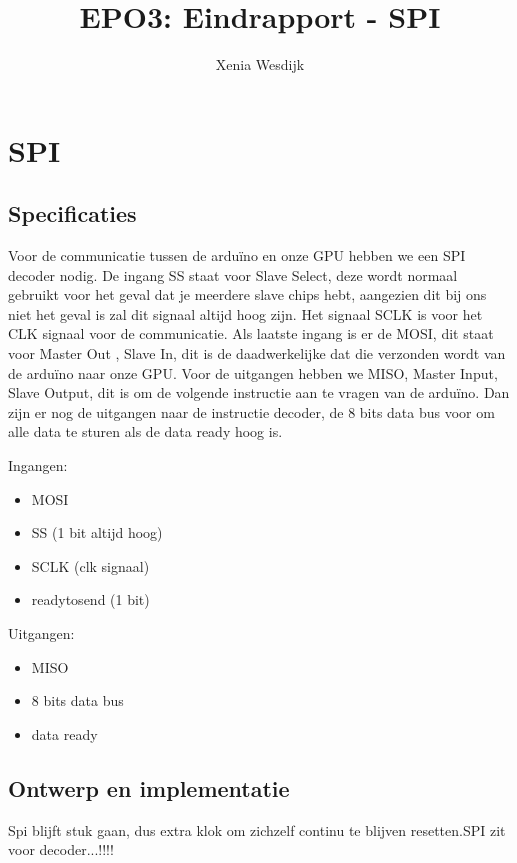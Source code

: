 \documentclass{scrartcl} %
\author{Xenia Wesdijk}
\title{EPO3: Eindrapport - SPI}
\begin{document}
\section{SPI}
\label{sec:spi}

\subsection{Specificaties}
Voor de communicatie tussen de arduïno en onze GPU hebben we een SPI decoder nodig. De ingang SS staat voor Slave Select, deze wordt normaal gebruikt voor het geval dat je meerdere slave chips hebt, aangezien dit bij ons niet het geval is zal dit signaal altijd hoog zijn. Het signaal SCLK is voor het CLK signaal voor de communicatie. Als laatste ingang is er de MOSI, dit staat voor Master Out , Slave In, dit is de daadwerkelijke dat die verzonden wordt van de arduïno naar onze GPU. Voor de uitgangen hebben we MISO, Master Input, Slave Output, dit is om de volgende instructie aan te vragen van de arduïno. Dan zijn er nog de uitgangen naar de instructie decoder, de 8 bits data bus voor om alle data te sturen als de data ready hoog is.

Ingangen: 
\begin{itemize}
	\item  MOSI
	\item SS (1 bit altijd hoog)
	\item SCLK (clk signaal)
	\item readytosend (1 bit)
\end{itemize}
Uitgangen:
\begin{itemize}
	\item MISO
	\item 8 bits data bus
	\item data ready  
\end{itemize}


\subsection{Ontwerp en implementatie}
Spi blijft stuk gaan, dus extra klok om zichzelf continu te blijven resetten.SPI zit voor decoder...!!!!

\end{document}
